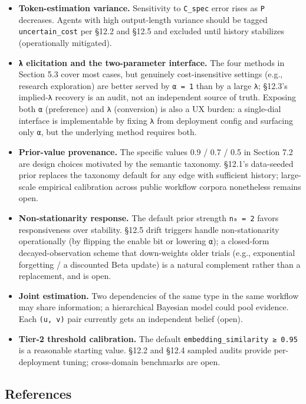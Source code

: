 \documentclass[
  11pt,
]{article}
\newcounter{none} %
\providecommand{\tightlist}{%
  \setlength{\itemsep}{0pt}\setlength{\parskip}{0pt}}
\begin{document}
\begin{itemize}
\tightlist
\item
  \textbf{Token-estimation variance.} Sensitivity to \texttt{C\_spec}
  error rises as \texttt{P} decreases. Agents with high output-length
  variance should be tagged \texttt{uncertain\_cost} per §12.2 and §12.5
  and excluded until history stabilizes (operationally mitigated).
\item
  \textbf{\texttt{λ} elicitation and the two-parameter interface.} The
  four methods in Section 5.3 cover most cases, but genuinely
  cost-insensitive settings (e.g., research exploration) are better
  served by \texttt{α\ =\ 1} than by a large \texttt{λ}; §12.3's
  implied-\texttt{λ} recovery is an audit, not an independent source of
  truth. Exposing both \texttt{α} (preference) and \texttt{λ}
  (conversion) is also a UX burden: a single-dial interface is
  implementable by fixing \texttt{λ} from deployment config and
  surfacing only \texttt{α}, but the underlying method requires both.
\item
  \textbf{Prior-value provenance.} The specific values 0.9 / 0.7 / 0.5
  in Section 7.2 are design choices motivated by the semantic taxonomy.
  §12.1's data-seeded prior replaces the taxonomy default for any edge
  with sufficient history; large-scale empirical calibration across
  public workflow corpora nonetheless remains open.
\item
  \textbf{Non-stationarity response.} The default prior strength
  \texttt{n₀\ =\ 2} favors responsiveness over stability. §12.5 drift
  triggers handle non-stationarity operationally (by flipping the enable
  bit or lowering \texttt{α}); a closed-form decayed-observation scheme
  that down-weights older trials (e.g., exponential forgetting / a
  discounted Beta update) is a natural complement rather than a
  replacement, and is open.
\item
  \textbf{Joint estimation.} Two dependencies of the same type in the
  same workflow may share information; a hierarchical Bayesian model
  could pool evidence. Each \texttt{(u,\ v)} pair currently gets an
  independent belief (open).
\item
  \textbf{Tier-2 threshold calibration.} The default
  \texttt{embedding\_similarity\ ≥\ 0.95} is a reasonable starting
  value. §12.2 and §12.4 sampled audits provide per-deployment tuning;
  cross-domain benchmarks are open.
\end{itemize}

\subsection{References}\label{references}
\end{document}
